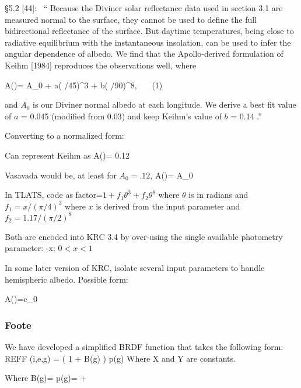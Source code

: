 \documentclass{article}
\begin{document}
 \S 5.2  [44]: \
`` Because
the Diviner solar reflectance data used in section 3.1 are
measured normal to the surface, they cannot be used to
define the full bidirectional reflectance of the surface. But
daytime temperatures, being close to radiative equilibrium
with the instantaneous insolation, can be used to infer the
angular dependence of albedo. We find that the Apollo-derived 
formulation of Keihm [1984] reproduces the observations well, where

 \qbn A(\theta)= A_0 + a\left( \theta/45\right)^3 + b\left( \theta/90\right)^8, 
\ \ \ (1) \qen 

and $A_0$  is our Diviner normal albedo at each longitude. We
derive a best fit value of $a$ = 0.045 (modified from 0.03) and
keep Keihm’s value of $b$ = 0.14 .''

Converting to a normalized form:

 Can represent Keihm as  \qbn A(\theta)= 0.12 \qen


Vasavada would be, at least for $A_0=.12$,   \qbn A(\theta)=  A_0\left[ 1.+0.375 \left(\theta/45\right)^3 
+ 1.17 \left( \theta/90\right)^8  \right] \qen

 In TLATS, code as factor=$1+ f_1 \theta^3+f_2\theta^8$ where $ \theta$ is in radians and $f_1=x/(\pi/4)^3$ where $x$ is derived from the input parameter and $f_2=1.17/(\pi/2)^8$

Both are encoded into KRC 3.4 by over-using the single available photometry parameter: -x: $0<x<1$  


In some later version of KRC, isolate several input parameters to handle
hemispheric albedo. Possible form:

\qbn A(\theta)=c_0  \qen

\subsubsection{Foote}

We have developed a simplified BRDF function that takes the following form:
\qb REFF (i,e,g) = \frac{2X}{\mu_0 + \mu + Y} \left( 1 + B(g) \right) p(g) \qe
Where X and Y are constants.
 
Where \qbn B(g)= 
 p(g)= + \qen
\end{document}
